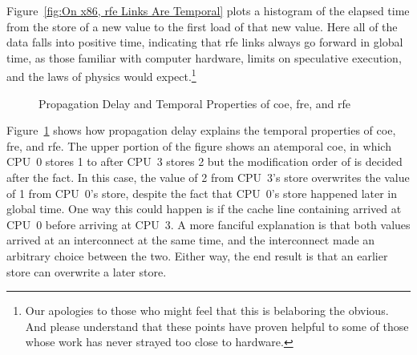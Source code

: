 \documentclass[10]{article}
\begin{document}
Figure~\ref{fig:On x86, rfe Links Are Temporal}
plots a histogram of the elapsed time from the store of a new value
to the first load of that new value.
Here all of the data falls into positive time, indicating
that rfe links always go forward in global time, as those familiar with
computer hardware, limits on speculative execution, and the laws of
physics would expect.\footnote{
	Our apologies to those who might feel that this is belaboring
	the obvious.
	And please understand that these points have proven helpful to
	some of those whose work has never strayed too close to
	hardware.}

\begin{figure}[tb]
\begin{center}
\caption{Propagation Delay and Temporal Properties of coe, fre, and rfe}
\label{fig:Propagation Delay and Temporal Properties of coe, fre, and rfe}
\end{center}
\end{figure}

Figure~\ref{fig:Propagation Delay and Temporal Properties of coe, fre, and rfe}
shows how propagation delay explains the temporal properties of coe,
fre, and rfe.
The upper portion of the figure shows an atemporal coe, in which
CPU~0 stores 1 to  after CPU~3 stores 2 but
the modification order of  is decided after the fact.
In this case, the value of 2 from CPU~3's store overwrites the value
of 1 from CPU~0's store, despite the fact that CPU~0's store
happened later in global time.
One way this could happen is if the cache line containing
 arrived at CPU~0 before arriving at CPU~3.
A more fanciful explanation is that both values arrived at an
interconnect at the same time, and the interconnect made an
arbitrary choice between the two.
Either way, the end result is that an earlier store can overwrite
a later store.
\end{document}
